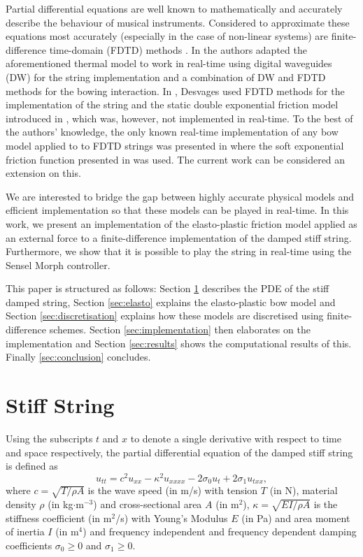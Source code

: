 \documentclass[twoside,a4paper]{article}
\begin{document}
Partial differential equations are well known to mathematically and accurately describe the behaviour of musical instruments. Considered to approximate these equations most accurately (especially in the case of non-linear systems) are finite-difference time-domain (FDTD) methods \cite{Bilbao2009, Bilbao2018}. In \cite{Maestre2014} the authors adapted the aforementioned thermal model to work in real-time using digital waveguides (DW) for the string implementation and a combination of DW and FDTD methods for the bowing interaction. In \cite{Desvages2017}, Desvages used FDTD methods for the implementation of the string and the static double exponential friction model introduced in \cite{Smith2000}, which was, however, not implemented in real-time. To the best of the authors' knowledge, the only known real-time implementation of any bow model applied to to FDTD strings was presented in \cite{Willemsen2019} where the soft exponential friction function presented in \cite{Bilbao2009} was used. The current work can be considered an extension on this.

We are interested to bridge the gap between highly accurate physical models and efficient implementation so that these models can be played in real-time. In this work, we present an implementation of the elasto-plastic friction model applied as an external force to a finite-difference implementation of the damped stiff string. Furthermore, we show that it is possible to play the string in real-time using the Sensel Morph controller.

This paper is structured as follows: Section \ref{sec:stiffString} describes the PDE of the stiff damped string, Section \ref{sec:elasto} explains the elasto-plastic bow model and Section \ref{sec:discretisation} explains how these models are discretised using finite-difference schemes. Section \ref{sec:implementation} then elaborates on the implementation and Section \ref{sec:results} shows the computational results of this. Finally \ref{sec:conclusion} concludes.

\section{Stiff String}\label{sec:stiffString}
Using the subscripts $t$ and $x$ to denote a single derivative with respect to time and space respectively, the partial differential equation of the damped stiff string is defined as \cite{Bilbao2009}
\begin{equation}\label{eq:PDE}
    u_{tt} = c^2u_{xx}-\kappa^2u_{xxxx}-2\sigma_0u_t+2\sigma_1u_{txx},
\end{equation}
where $c = \sqrt{T/\rho A}$ is the wave speed (in m/s) with tension $T$ (in N), material density $\rho$ (in kg$\cdot$m$^{-3}$) and cross-sectional area $A$ (in m$^2$), $\kappa = \sqrt{EI/\rho A}$ is the stiffness coefficient (in m$^2$/s) with Young's Modulus $E$ (in Pa) and area moment of inertia $I$ (in m$^4$) and frequency independent and frequency dependent damping coefficients $\sigma_0 \geq 0$ and $\sigma_1 \geq 0$.
\end{document}
